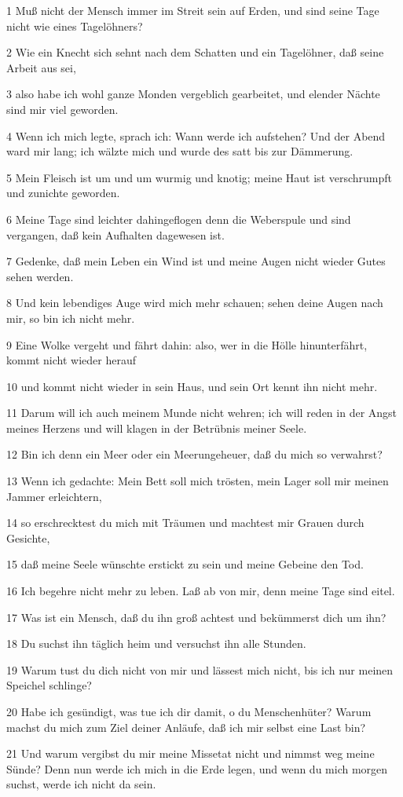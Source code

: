 \par 1 Muß nicht der Mensch immer im Streit sein auf Erden, und sind seine Tage nicht wie eines Tagelöhners?
\par 2 Wie ein Knecht sich sehnt nach dem Schatten und ein Tagelöhner, daß seine Arbeit aus sei,
\par 3 also habe ich wohl ganze Monden vergeblich gearbeitet, und elender Nächte sind mir viel geworden.
\par 4 Wenn ich mich legte, sprach ich: Wann werde ich aufstehen? Und der Abend ward mir lang; ich wälzte mich und wurde des satt bis zur Dämmerung.
\par 5 Mein Fleisch ist um und um wurmig und knotig; meine Haut ist verschrumpft und zunichte geworden.
\par 6 Meine Tage sind leichter dahingeflogen denn die Weberspule und sind vergangen, daß kein Aufhalten dagewesen ist.
\par 7 Gedenke, daß mein Leben ein Wind ist und meine Augen nicht wieder Gutes sehen werden.
\par 8 Und kein lebendiges Auge wird mich mehr schauen; sehen deine Augen nach mir, so bin ich nicht mehr.
\par 9 Eine Wolke vergeht und fährt dahin: also, wer in die Hölle hinunterfährt, kommt nicht wieder herauf
\par 10 und kommt nicht wieder in sein Haus, und sein Ort kennt ihn nicht mehr.
\par 11 Darum will ich auch meinem Munde nicht wehren; ich will reden in der Angst meines Herzens und will klagen in der Betrübnis meiner Seele.
\par 12 Bin ich denn ein Meer oder ein Meerungeheuer, daß du mich so verwahrst?
\par 13 Wenn ich gedachte: Mein Bett soll mich trösten, mein Lager soll mir meinen Jammer erleichtern,
\par 14 so erschrecktest du mich mit Träumen und machtest mir Grauen durch Gesichte,
\par 15 daß meine Seele wünschte erstickt zu sein und meine Gebeine den Tod.
\par 16 Ich begehre nicht mehr zu leben. Laß ab von mir, denn meine Tage sind eitel.
\par 17 Was ist ein Mensch, daß du ihn groß achtest und bekümmerst dich um ihn?
\par 18 Du suchst ihn täglich heim und versuchst ihn alle Stunden.
\par 19 Warum tust du dich nicht von mir und lässest mich nicht, bis ich nur meinen Speichel schlinge?
\par 20 Habe ich gesündigt, was tue ich dir damit, o du Menschenhüter? Warum machst du mich zum Ziel deiner Anläufe, daß ich mir selbst eine Last bin?
\par 21 Und warum vergibst du mir meine Missetat nicht und nimmst weg meine Sünde? Denn nun werde ich mich in die Erde legen, und wenn du mich morgen suchst, werde ich nicht da sein.

